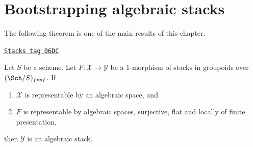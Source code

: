 \section{Bootstrapping algebraic stacks}
\label{criteria-section-bootstrap}
The following theorem is one of the main results of this chapter.

\begin{theorem}
\label{criteria-theorem-bootstrap}
\href{https://stacks.math.columbia.edu/tag/06DC}{\texttt{Stacks tag 06DC}}


Let $S$ be a scheme. Let $F : \mathcal{X} \to \mathcal{Y}$
be a $1$-morphism of stacks in groupoids over $(\Sch/S)_{fppf}$. If
\begin{enumerate}
\item $\mathcal{X}$ is representable by an algebraic space, and
\item $F$ is representable by algebraic spaces, surjective, flat and
locally of finite presentation,
\end{enumerate}
then $\mathcal{Y}$ is an algebraic stack.
\end{theorem}

